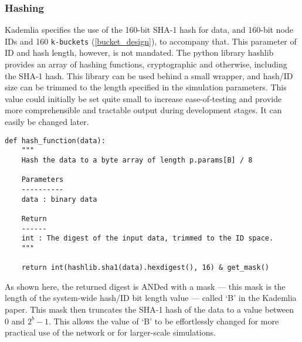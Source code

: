 \documentclass[12pt]{report}
\newcommand{\code}[1]{\colorbox{codegray}{\texttt{#1}}}
\begin{document}
            \subsubsection{Hashing\label{hashing_design}}
                Kademlia specifies the use of the 160-bit SHA-1 hash for data,
                and 160-bit node IDs and 160
                \code{k-buckets} (\ref{bucket_design}), to accompany that.
                This parameter of ID and hash length, however, is not mandated.
                The python library hashlib provides an array of hashing
                functions, cryptographic and otherwise, including the SHA-1
                hash.  This library can be used behind a small wrapper, and
                hash/ID size can be trimmed to the length specified in the
                simulation parameters.  This value could initially be set quite
                small to increase ease-of-testing and provide more
                comprehensible and tractable output during development stages.
                It can easily be changed later.
\begin{lstlisting}[label=hash_function]
def hash_function(data):
    """
    Hash the data to a byte array of length p.params[B] / 8

    Parameters
    ----------
    data : binary data
    
    Return
    ------
    int : The digest of the input data, trimmed to the ID space.
    """
        
    return int(hashlib.sha1(data).hexdigest(), 16) & get_mask() 
\end{lstlisting}
            
            As shown here, the returned digest is ANDed with a mask --- this
            mask is the length of the system-wide hash/ID bit length value ---
            called `B' in the Kademlia paper.  This mask then truncates the
            SHA-1 hash of the data to a value between 0 and $2^b-1$.  This
            allows the value of `B' to be effortlessly changed for more
            practical use of the network or for larger-scale simulations.
\end{document}
